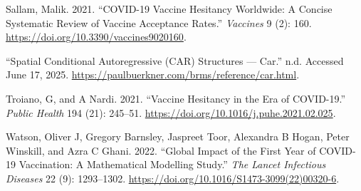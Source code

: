 \documentclass{article}
\newlength{\cslhangindent}
\newenvironment{CSLReferences}[2] %
 {\begin{list}{}{%
  \setlength{\itemindent}{0pt}
  \setlength{\leftmargin}{0pt}
  \setlength{\parsep}{0pt}
  \ifodd #1
   \setlength{\leftmargin}{\cslhangindent}
   \setlength{\itemindent}{-1\cslhangindent}
  \fi
  \setlength{\itemsep}{#2\baselineskip}}}
 {\end{list}}
\begin{document}
\begin{CSLReferences}{1}{0}
Sallam, Malik. 2021. {``COVID-19 Vaccine Hesitancy Worldwide: A Concise
Systematic Review of Vaccine Acceptance Rates.''} \emph{Vaccines} 9 (2):
160. \url{https://doi.org/10.3390/vaccines9020160}.

{``Spatial Conditional Autoregressive ({CAR}) Structures --- Car.''}
n.d. Accessed June 17, 2025.
\url{https://paulbuerkner.com/brms/reference/car.html}.

Troiano, G, and A Nardi. 2021. {``Vaccine Hesitancy in the Era of
COVID-19.''} \emph{Public Health} 194 (21): 245--51.
\url{https://doi.org/10.1016/j.puhe.2021.02.025}.

Watson, Oliver J, Gregory Barnsley, Jaspreet Toor, Alexandra B Hogan,
Peter Winskill, and Azra C Ghani. 2022. {``Global Impact of the First
Year of COVID-19 Vaccination: A Mathematical Modelling Study.''}
\emph{The Lancet Infectious Diseases} 22 (9): 1293--1302.
\url{https://doi.org/10.1016/S1473-3099(22)00320-6}.

\end{CSLReferences}



\end{document}
